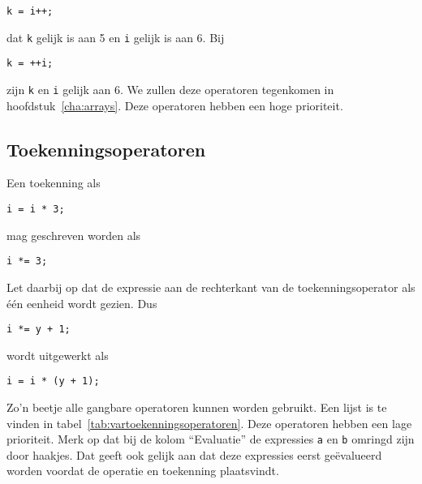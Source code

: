 \hspace*{1em}\texttt{k = i++;}

dat \texttt{k} gelijk is aan 5 en \texttt{i} gelijk is aan 6. Bij

\hspace*{1em}\texttt{k = ++i;}

zijn \texttt{k} en \texttt{i} gelijk aan 6. We zullen deze operatoren tegenkomen in hoofdstuk~\ref{cha:arrays}. Deze operatoren hebben een hoge prioriteit.

\subsection{Toekenningsoperatoren}
Een toekenning als

\hspace*{1em}\texttt{i = i * 3;}

mag geschreven worden als

\hspace*{1em}\texttt{i *= 3;}

Let daarbij op dat de expressie aan de rechterkant van de toekenningsoperator als één eenheid wordt gezien. Dus

\hspace*{1em}\texttt{i *= y + 1;}

wordt uitgewerkt als

\hspace*{1em}\texttt{i = i * (y + 1);}

Zo'n beetje alle gangbare operatoren kunnen worden gebruikt. Een lijst is te vinden in tabel~\ref{tab:vartoekenningsoperatoren}. Deze operatoren hebben een lage prioriteit. Merk op dat bij de kolom ``Evaluatie'' de expressies \texttt{a} en \texttt{b} omringd zijn door haakjes. Dat geeft ook gelijk aan dat deze expressies eerst geëvalueerd worden voordat de operatie en toekenning plaatsvindt.

